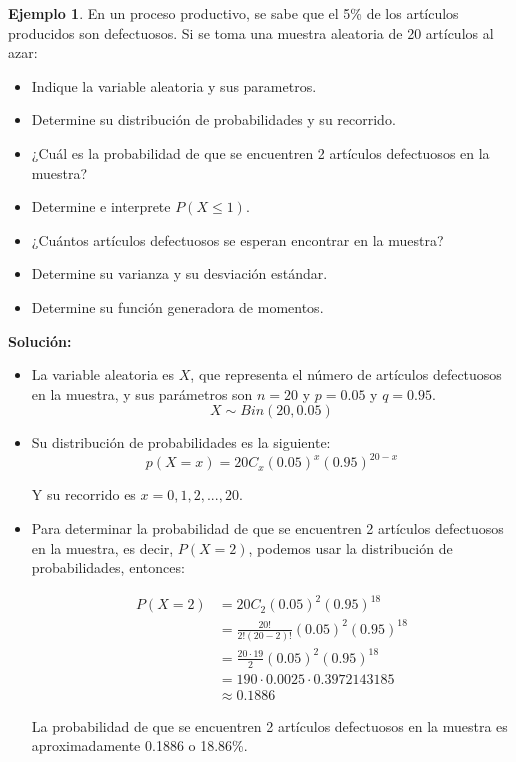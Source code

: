 \documentclass{article}
\theoremstyle{definition}
\newtheorem{example}[definition]{Ejemplo}
\theoremstyle{plain}
\theoremstyle{remark}
\begin{document}
\begin{example}
En un proceso productivo, se sabe que el 5\% de los artículos producidos son defectuosos. Si se toma una muestra aleatoria de 20 artículos al azar:

\begin{itemize}
\item Indique la variable aleatoria y sus parametros.
\item Determine su distribución de probabilidades y su recorrido.
\item ¿Cuál es la probabilidad de que se encuentren 2 artículos defectuosos en la muestra?
\item Determine e interprete $P(X \leq 1)$.
\item ¿Cuántos artículos defectuosos se esperan encontrar en la muestra?
\item Determine su varianza y su desviación estándar.
\item Determine su función generadora de momentos.
\end{itemize}

\textbf{Solución:}

\begin{itemize}
\item La variable aleatoria es $X$, que representa el número de artículos defectuosos en la muestra, y sus parámetros son $n = 20$ y $p = 0.05$ y $q = 0.95$.
\[
X \sim Bin(20, 0.05) 
\]
\item Su distribución de probabilidades es la siguiente:
\[
p(X = x) = 20 C_x (0.05)^x (0.95)^{20-x}
\]

Y su recorrido es $x = 0, 1, 2, ..., 20$.

\item Para determinar la probabilidad de que se encuentren 2 artículos defectuosos en la muestra, es decir, $P(X = 2)$, podemos usar la distribución de probabilidades, entonces:

\begin{align*}
P(X = 2) &= 20 C_2 (0.05)^2 (0.95)^{18} \\
&= \frac{20!}{2! (20-2)!} (0.05)^2 (0.95)^{18} \\
&= \frac{20 \cdot 19}{2} (0.05)^2 (0.95)^{18} \\
&= 190 \cdot 0.0025 \cdot 0.3972143185 \\
&\approx 0.1886
\end{align*}

La probabilidad de que se encuentren 2 artículos defectuosos en la muestra es aproximadamente 0.1886 o 18.86\%.


\end{itemize}
\end{example}
\end{document}
